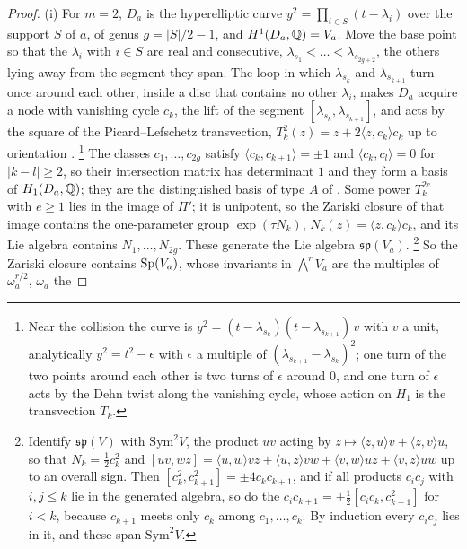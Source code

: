 \begin{proof}
(i) For $m=2$, $D_{a}$ is the hyperelliptic curve
$y^{2}=\prod_{i\in S}(t-\lambda_{i})$ over the support $S$ of $a$, of genus
$g=|S|/2-1$, and $H^{1}(D_{a},\mathbb{Q})=V_{a}$. Move the base point so that the
$\lambda_{i}$ with $i\in S$ are real and consecutive, $\lambda_{s_{1}}<\dots<
\lambda_{s_{2g+2}}$, the others lying away from the segment they span. The
loop in which $\lambda_{s_{k}}$ and $\lambda_{s_{k+1}}$ turn once around each
other, inside a disc that contains no other $\lambda_{i}$, makes $D_{a}$
acquire a node with vanishing cycle $c_{k}$, the lift of the segment
$[\lambda_{s_{k}},\lambda_{s_{k+1}}]$, and acts by the square of the
Picard--Lefschetz transvection,
$T_{k}^{2}(z)=z+2\langle z,c_{k}\rangle c_{k}$ up to orientation
\cite[Chapter~3]{Voi03}.%
\footnote{Near the collision the curve is $y^{2}=(t-\lambda_{s_{k}})
(t-\lambda_{s_{k+1}})\,v$ with $v$ a unit, analytically $y^{2}=t^{2}-\epsilon$
with $\epsilon$ a multiple of $(\lambda_{s_{k+1}}-\lambda_{s_{k}})^{2}$; one
turn of the two points around each other is two turns of $\epsilon$ around
$0$, and one turn
of $\epsilon$ acts by the Dehn twist along the vanishing cycle, whose action on
$H_{1}$ is the transvection $T_{k}$.} The classes $c_{1},\dots,c_{2g}$ satisfy
$\langle c_{k},c_{k+1}\rangle=\pm1$ and $\langle c_{k},c_{l}\rangle=0$ for
$|k-l|\ge2$, so their intersection matrix has determinant $1$ and they form a
basis of $H_{1}(D_{a},\mathbb{Q})$; they are the distinguished basis of type $A$ of
\cite{ACa79}. Some power $T_{k}^{2e}$ with $e\ge1$ lies in the image of
$\Pi'$; it is unipotent, so the Zariski closure of that image contains the
one-parameter group $\exp(\tau N_{k})$, $N_{k}(z)=\langle z,c_{k}\rangle c_{k}$,
and its Lie algebra contains $N_{1},\dots,N_{2g}$. These generate the Lie
algebra $\mathfrak{sp}(V_{a})$.%
\footnote{Identify $\mathfrak{sp}(V)$ with $\mathrm{Sym}^{2}V$, the product $uv$
acting by $z\mapsto\langle z,u\rangle v+\langle z,v\rangle u$, so that
$N_{k}=\tfrac12c_{k}^{2}$ and
$[uv,wz]=\langle u,w\rangle vz+\langle u,z\rangle vw+\langle v,w\rangle uz
+\langle v,z\rangle uw$ up to an overall sign. Then
$[c_{k}^{2},c_{k+1}^{2}]=\pm4c_{k}c_{k+1}$, and if all products
$c_{i}c_{j}$ with $i,j\le k$ lie in the generated algebra, so do the
$c_{i}c_{k+1}=\pm\tfrac12[c_{i}c_{k},c_{k+1}^{2}]$ for $i<k$, because
$c_{k+1}$ meets only $c_{k}$ among $c_{1},\dots,c_{k}$. By induction every
$c_{i}c_{j}$ lies in it, and these span $\mathrm{Sym}^{2}V$.} So the Zariski
closure contains $\operatorname{Sp}(V_{a})$, whose invariants in
$\bigwedge^{r}V_{a}$ are the multiples of $\omega_{a}^{r/2}$, $\omega_{a}$ the

\end{proof}
